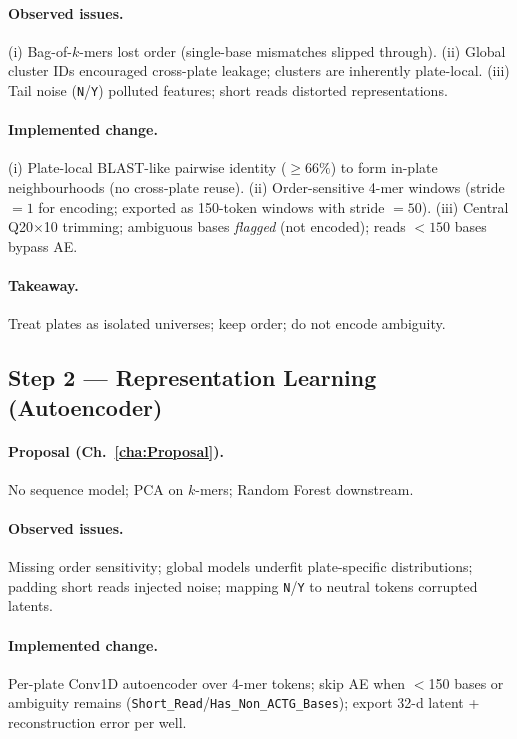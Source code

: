 \paragraph{Observed issues.}
(i) Bag-of-$k$-mers lost order (single-base mismatches slipped through). 
(ii) Global cluster IDs encouraged cross-plate leakage; clusters are inherently plate-local.
(iii) Tail noise (\texttt{N}/\texttt{Y}) polluted features; short reads distorted representations.

\paragraph{Implemented change.}
(i) Plate-local BLAST-like pairwise identity ($\geq 66\%$) to form in-plate neighbourhoods (no cross-plate reuse). 
(ii) Order-sensitive 4-mer windows (stride $=1$ for encoding; exported as 150-token windows with stride $=50$). 
(iii) Central Q20$\times$10 trimming; ambiguous bases \emph{flagged} (not encoded); reads $<150$ bases bypass AE.

\paragraph{Takeaway.} Treat plates as isolated universes; keep order; do not encode ambiguity.

\subsection*{Step 2 — Representation Learning (Autoencoder)}
\paragraph{Proposal (Ch.~\ref{cha:Proposal}).}
No sequence model; PCA on $k$-mers; Random Forest downstream.

\paragraph{Observed issues.}
Missing order sensitivity; global models underfit plate-specific distributions; padding short reads injected noise; mapping \texttt{N}/\texttt{Y} to neutral tokens corrupted latents.

\paragraph{Implemented change.}
Per-plate Conv1D autoencoder over 4-mer tokens; skip AE when $<$150 bases or ambiguity remains (\texttt{Short\_Read}/\texttt{Has\_Non\_ACTG\_Bases}); export 32-d latent + reconstruction error per well.

